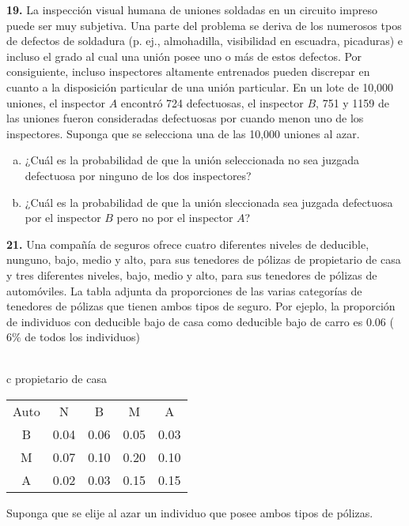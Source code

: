 \documentclass[12pt, letterpaper, spanish]{article}
\begin{document}
\textbf{19.} La inspección visual humana de uniones soldadas en un circuito impreso puede ser muy subjetiva. Una parte del problema se deriva de los numerosos tpos de defectos de soldadura (p. ej., almohadilla, visibilidad en escuadra, picaduras) e incluso el grado al cual una unión posee uno o más de estos defectos. Por consiguiente, incluso inspectores altamente entrenados pueden discrepar en cuanto a la disposición particular de una unión particular. En un lote de 10,000 uniones, el inspector $A$ encontró 724 defectuosas, el inspector $B$, 751 y 1159 de las uniones fueron consideradas defectuosas  por cuando menon uno de los inspectores. Suponga que se selecciona una de las  10,000 uniones al azar.
\begin{enumerate}[a)]
    \item ¿Cuál es la probabilidad de que la unión seleccionada no sea juzgada defectuosa por ninguno de los dos inspectores?
    \item ¿Cuál es la probabilidad de que la unión sleccionada sea juzgada defectuosa por el inspector $B$ pero no por el inspector $A$?
\end{enumerate}

\textbf{21.} Una compañía de seguros ofrece cuatro diferentes niveles de deducible, nunguno, bajo, medio y alto, para sus tenedores de pólizas de propietario de casa y tres diferentes niveles, bajo, medio y alto, para sus tenedores de pólizas de automóviles. La tabla adjunta da proporciones de las varias categorías de tenedores de pólizas que tienen ambos tipos de seguro. Por ejeplo, la proporción de individuos con deducible bajo de casa como deducible bajo de carro es 0.06 ($6\%$ de todos los individuos)\\ \\
\begin{tabular}{c}
    propietario de casa  \\
    \begin{tabular}{ccccc}
        \hline
        Auto & N & B & M & A\\
        B & 0.04 & 0.06 & 0.05 & 0.03\\
        M & 0.07 & 0.10 & 0.20 & 0.10\\
        A & 0.02 & 0.03 & 0.15 & 0.15

    \end{tabular}
\end{tabular}
Suponga que se elije al azar un individuo que posee ambos tipos de pólizas.
\end{document}
